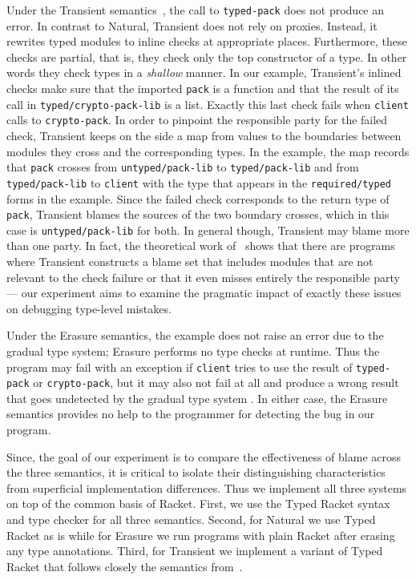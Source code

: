 Under the Transient semantics~\cite{vss-popl-2017}, the call to \texttt{typed-pack} does not
produce an error. In contrast to Natural, Transient does not rely on
proxies. Instead, it rewrites typed modules to inline checks at appropriate
places. Furthermore, these checks are
partial, that is, they check only the top constructor of a type. In other words
they check types in a  \emph{shallow} manner. In our
example, Transient's inlined checks make sure that the imported \texttt{pack} 
is a function and that the result of its call in \texttt{typed/crypto-pack-lib} is a list.   Exactly this
last check fails when \texttt{client} calls to \texttt{crypto-pack}. In
order to pinpoint the responsible party for the failed check, Transient
keeps on the side a map from values to the boundaries between modules they
cross and the corresponding types. In the example, the map records that
\texttt{pack} crosses from \texttt{untyped/pack-lib} to
\texttt{typed/pack-lib} and from \texttt{typed/pack-lib} to
\texttt{client} with the type that appears in the \texttt{required/typed}
forms in the example. Since the failed check corresponds to the return
type of \texttt{pack}, Transient blames the sources of the two boundary
crosses, which in this case is \texttt{untyped/pack-lib} for both. In
general though, Transient may blame more than one party. In fact, the
theoretical work of~\citet{gfd-oopsla-2019} shows that there are programs
where Transient constructs a blame set that includes modules that are not
relevant to the check failure or that it even misses entirely the responsible
party ---  our experiment aims to examine the pragmatic impact of exactly these
issues on debugging type-level mistakes.

Under the Erasure semantics, the example does not raise an error due to the
gradual type system; Erasure performs no type checks at runtime. Thus the
program may fail with an exception if \texttt{client} tries to use the
result of \texttt{typed-pack} or \texttt{crypto-pack}, but it may also not
fail at all and produce a wrong result that goes undetected by the
gradual type system .  In either case, the Erasure semantics provides no
help to the programmer for detecting the bug in our program. 

Since, the goal of our experiment is to compare the effectiveness of blame
across the three semantics, it is critical to isolate their
distinguishing characteristics from superficial implementation
differences. Thus we implement all three systems on top of the common
basis of Racket. First, we use the Typed Racket syntax and type
checker for all three semantics. Second, for Natural we use Typed Racket as
is while for Erasure we run programs with plain Racket after erasing any
type annotations. Third, for Transient we implement a variant of Typed
Racket that follows closely the semantics from~\citet{vss-popl-2017}. 

